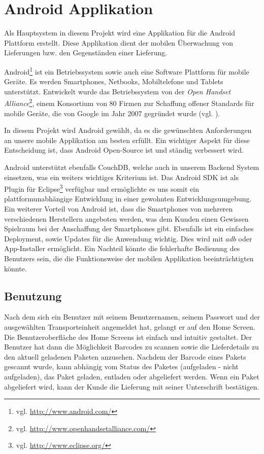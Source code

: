 \section{Android Applikation}
\label{sec:android}

Als Hauptsystem in diesem Projekt wird eine Applikation für die Android
	Plattform erstellt. Diese Applikation dient der mobilen Überwachung
	von Lieferungen bzw. den Gegenständen einer Lieferung.

Android\footnote{vgl. \url{http://www.android.com/}} ist ein Betriebssystem sowie auch
	eine Software Plattform für mobile Geräte. Es werden Smartphones, Netbooks,
	Mobiltelefone und Tablets unterstützt. Entwickelt wurde das Betriebssystem
	von der \emph{Open Handset Alliance}\footnote{vgl.
	\url{http://www.openhandsetalliance.com/}},
	einem Konsortium von 80 Firmen zur Schaffung offener Standards für mobile Geräte,
	die von Google im Jahr 2007 gegründet wurde (vgl. \cite{OHA07}). 

In diesem Projekt wird Android gewählt, da es die gewünschten Anforderungen an unsere
	mobile Applikation am besten erfüllt. Ein wichtiger Aspekt für diese Entscheidung
	ist, dass Android Open-Source ist und ständig verbessert wird.

Android unterstützt ebenfalls CouchDB, welche auch in unserem Backend System einsetzen,
	was ein weiters wichtiges Kriterium ist. Das Android SDK ist als Plugin für
	Eclipse\footnote{vgl. \url{http://www.eclipse.org/}} verfügbar und ermöglichte
	es uns somit ein plattformunabhängige Entwicklung in einer gewohnten
	Entwicklungsumgebung. Ein weiterer Vorteil von Android ist, dass die Smartphones
	von mehreren verschiedenen Herstellern angeboten werden, was dem Kunden einen
	Gewissen Spielraum bei der Anschaffung der Smartphones gibt. Ebenfalls ist
	ein einfaches Deployment, sowie Updates für die Anwendung wichtig. Dies wird mit
	$adb$ oder App-Installer ermöglicht. Ein Nachteil könnte die fehlerhafte
	Bedienung des Benutzers sein, die die Funktionsweise der mobilen Applikation
	beeinträchtigten könnte.

\subsection{Benutzung}

Nach dem sich ein Benutzer mit seinem Benutzernamen, seinem Passwort und der ausgewählten Transporteinheit angemeldet hat, gelangt er auf den Home Screen.
Die Benutzeroberfläche des Home Screens ist einfach und intuitiv gestaltet. Der Benutzer hat dann die Möglichkeit 
Barcodes zu scannen sowie die Lieferdetails zu den aktuell geladenen Paketen anzusehen.
Nachdem der Barcode eines Pakets gescannt wurde, kann abhängig vom Status des Paketes (aufgeladen - nicht aufgeladen), das Paket
geladen, entladen oder abgeliefert werden. Wenn ein Paket abgeliefert wird, kann der Kunde die Lieferung mit seiner Unterschrift bestätigen.

